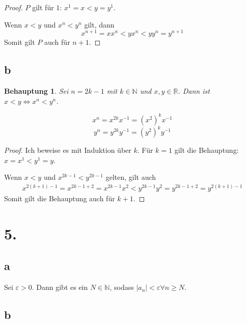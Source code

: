 \documentclass[a4paper,10pt]{article}
\newtheorem*{claim}{Behauptung}
\begin{document}
\begin{proof}
 $P$ gilt für $1$: $x^1 = x < y = y^1$.
 
 Wenn $x < y$ und $x^n < y^n$ gilt, dann
 \begin{equation*}
  x^{n + 1} = xx^n < yx^n < yy^n = y^{n + 1}
 \end{equation*}
 Somit gilt $P$ auch für $n + 1$.
\end{proof}

\subsection*{b}

\begin{claim}
 Sei $n = 2k - 1$ mit $k \in \mathbb{N}$ und $x, y \in \mathbb{R}$.
 Dann ist $x < y \Leftrightarrow x^n < y^n$.
\end{claim}

\begin{equation*}
 x^n = x^{2k}x^{-1} = (x^2)^kx^{-1}
\end{equation*}
\begin{equation*}
 y^n = y^{2k}y^{-1} = (y^2)^ky^{-1}
\end{equation*}

\begin{proof}
 Ich beweise es mit Induktion über $k$.
 Für $k = 1$ gilt die Behauptung: $x = x^1 < y^1 = y$.
 
 Wenn $x < y$ und $x^{2k - 1} < y^{2k - 1}$ gelten, gilt auch
 \begin{align*}
  x^{2(k + 1) - 1} = x^{2k - 1 + 2} = x^{2k - 1}x^2 < y^{2k - 1}y^2 = y^{2k - 1 + 2} = y^{2(k + 1) - 1}
 \end{align*}
 Somit gilt die Behauptung auch für $k + 1$.
\end{proof}

\section*{5.}

\subsection*{a}

Sei $\varepsilon > 0$.
Dann gibt es ein $N \in \mathbb{N}$, sodass $|a_n| < \varepsilon \forall n \ge N$.

\subsection*{b}
\end{document}
